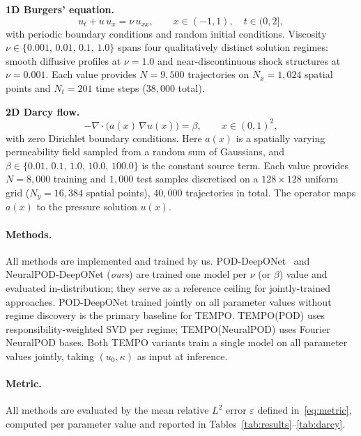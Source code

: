 \documentclass{article}
\begin{document}
\textbf{1D Burgers' equation.}
\begin{equation}
  u_t + u\,u_x = \nu\,u_{xx},
  \qquad x\in(-1,1),\quad t\in(0,2],
  \label{eq:burgers}
\end{equation}
with periodic boundary conditions and random initial conditions.
Viscosity $\nu\in\{0.001,\,0.01,\,0.1,\,1.0\}$ spans four qualitatively
distinct solution regimes: smooth diffusive profiles at $\nu{=}1.0$ and
near-discontinuous shock structures at $\nu{=}0.001$.
Each value provides $N{=}9{,}500$ trajectories on $N_x{=}1{,}024$
spatial points and $N_t{=}201$ time steps ($38{,}000$ total).

\textbf{2D Darcy flow.}
\begin{equation}
  -\nabla\cdot\bigl(a(x)\,\nabla u(x)\bigr) = \beta,
  \qquad x\in(0,1)^2,
  \label{eq:darcy}
\end{equation}
with zero Dirichlet boundary conditions.
Here $a(x)$ is a spatially varying permeability field sampled from a
random sum of Gaussians, and $\beta\in\{0.01,\,0.1,\,1.0,\,10.0,\,100.0\}$
is the constant source term.
Each value provides $N{=}8{,}000$ training and $1{,}000$ test samples
discretised on a $128{\times}128$ uniform grid ($N_y{=}16{,}384$ spatial points),
$40{,}000$ trajectories in total.
The operator maps $a(x)$ to the pressure solution $u(x)$.

\paragraph{Methods.}
All methods are implemented and trained by us.
POD-DeepONet~\cite{Lu2022} and NeuralPOD-DeepONet (\textit{ours}) are trained
one model per $\nu$ (or $\beta$) value and evaluated in-distribution;
they serve as a reference ceiling for jointly-trained approaches.
POD-DeepONet trained jointly on all parameter values without regime discovery
is the primary baseline for TEMPO.
TEMPO(POD) uses responsibility-weighted SVD per regime;
TEMPO(NeuralPOD) uses Fourier NeuralPOD bases.
Both TEMPO variants train a single model on all parameter values jointly,
taking $(u_0, \kappa)$ as input at inference.

\paragraph{Metric.}
All methods are evaluated by the mean relative $L^2$ error $\varepsilon$
defined in~\eqref{eq:metric}, computed per parameter value and reported
in Tables~\ref{tab:results}--\ref{tab:darcy}.
\end{document}
